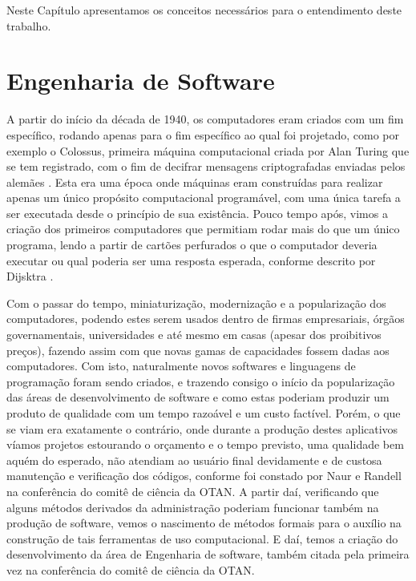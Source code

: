 \label{referencial}

Neste Capítulo apresentamos os conceitos necessários para o entendimento deste trabalho. 

\section{Engenharia de Software}

 A partir do início da década de 1940, os computadores eram criados com um fim específico, rodando apenas para o fim específico ao qual foi projetado, como por exemplo o Colossus, primeira máquina computacional criada  por Alan Turing que se tem registrado, com o fim de decifrar mensagens criptografadas enviadas pelos alemães \cite{colossus}. Esta era uma época onde máquinas eram construídas para realizar apenas um único propósito computacional programável, com uma única tarefa a ser executada desde o princípio de sua existência. Pouco tempo após, vimos a criação dos primeiros computadores que permitiam rodar mais do que um único programa, lendo a partir de cartões perfurados o que o computador deveria executar ou qual poderia ser uma resposta esperada, conforme descrito por Dijsktra \cite{Humble}. 
 
 Com o passar do tempo, miniaturização, modernização e a popularização dos computadores, podendo estes serem usados dentro de firmas empresariais, órgãos governamentais, universidades e até mesmo em casas (apesar dos proibitivos preços), fazendo assim com que novas gamas de capacidades fossem dadas aos computadores. Com isto, naturalmente novos softwares e linguagens de programação foram sendo criados, e trazendo consigo o início da popularização das áreas de desenvolvimento de software e como estas poderiam produzir um produto de qualidade com um tempo razoável e um custo factível. Porém, o que se viam era exatamente o contrário, onde durante a produção destes aplicativos víamos projetos estourando o orçamento e o tempo previsto, uma qualidade bem aquém do esperado, não atendiam ao usuário final devidamente e de custosa manutenção e verificação dos códigos, conforme foi constado por Naur e Randell na conferência do comitê de ciência da \acrshort{OTAN}\cite{NATO}. A partir daí, verificando que alguns métodos derivados da administração poderiam funcionar também na produção de software, vemos o nascimento de métodos formais para o auxílio na construção de tais ferramentas de uso computacional. E daí, temos a criação do desenvolvimento da área de Engenharia de software, também citada pela primeira vez na conferência do comitê de ciência da \acrshort{OTAN}\cite{NATO}.

